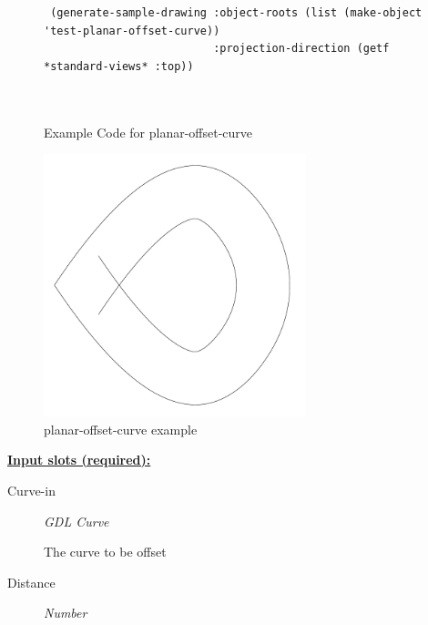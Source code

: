 \documentclass [11pt]{book}
\begin{document}
\begin{itemize}
\begin{figure}
\begin{lrbox}{\boxedverb}
\begin{minipage}{\linewidth}
{\begin{verbatim}
 (generate-sample-drawing :object-roots (list (make-object 'test-planar-offset-curve))
                          :projection-direction (getf *standard-views* :top))

 
\end{verbatim}}
\end{minipage}
\end{lrbox}
\fbox{\usebox{\boxedverb}}

\caption{Example Code for planar-offset-curve}

\label{fig:example-code-planar-offset-curve}

\end{figure}

\begin{figure}
\begin{center}
\includegraphics[width=3in,height=3in]{../images/example-planar-offset-curve.pdf}
\end{center}

\caption{planar-offset-curve example}

\label{fig:planar-offset-curve}

\end{figure}





\textbf{
\underline{Input slots (required):}}

\begin{description}

\item [Curve-in]
\emph{GDL Curve}

 The curve to be offset




\item [Distance]
\emph{Number}


\end{description}
\end{itemize}
\end{document}
